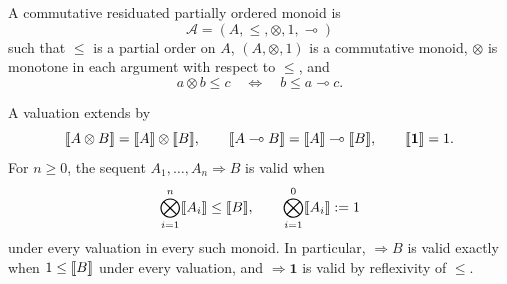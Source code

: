 \begin{definition}
A commutative residuated partially ordered monoid is
\[
  \mathcal A=(A,\leq,\otimes,1,\multimap)
\]
such that \(\leq\) is a partial order on \(A\), \((A,\otimes,1)\) is a
commutative monoid, \(\otimes\) is monotone in each argument with respect
to \(\leq\), and
\[
  a\otimes b\leq c
  \quad\Longleftrightarrow\quad
  b\leq a\multimap c.
\]
\end{definition}

A valuation extends by
\[
  \llbracket A\otimes B\rrbracket=\llbracket A\rrbracket\otimes\llbracket B\rrbracket,
  \qquad
  \llbracket A\multimap B\rrbracket=\llbracket A\rrbracket\multimap\llbracket B\rrbracket,
  \qquad
  \llbracket\mathbf1\rrbracket=1.
\]
\label{def:p08-imll-empty-tensor}
For \(n\geq0\), the sequent \(A_1,\ldots,A_n\Rightarrow B\) is valid when
\[
  \bigotimes_{i=1}^{n}\llbracket A_i\rrbracket\leq\llbracket B\rrbracket,
  \qquad
  \bigotimes_{i=1}^{0}\llbracket A_i\rrbracket\mathrel{:=}1
\]
under every valuation in every such monoid.
In particular, \(\Rightarrow B\) is valid exactly when
\(1\leq\llbracket B\rrbracket\) under every valuation, and \(\Rightarrow\mathbf1\)
is valid by reflexivity of \(\leq\).
